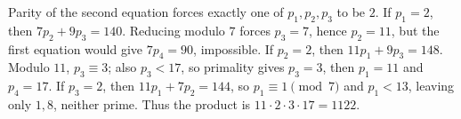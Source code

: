 Parity of the second equation forces exactly one of $p_1,p_2,p_3$ to be $2$. If $p_1=2$, then $7p_2+9p_3=140$. Reducing modulo $7$ forces $p_3=7$, hence $p_2=11$, but the first equation would give $7p_4=90$, impossible. If $p_2=2$, then $11p_1+9p_3=148$. Modulo $11$, $p_3\equiv3$; also $p_3<17$, so primality gives $p_3=3$, then $p_1=11$ and $p_4=17$. If $p_3=2$, then $11p_1+7p_2=144$, so $p_1\equiv1\pmod7$ and $p_1<13$, leaving only $1,8$, neither prime. Thus the product is $11\cdot2\cdot3\cdot17=\boxed{1122}$.
